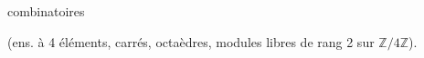  combinatoires

(ens. à 4 éléments, carrés, octaèdres,
modules libres de rang 2 sur $\mathbb{Z}/4\mathbb{Z}$).
